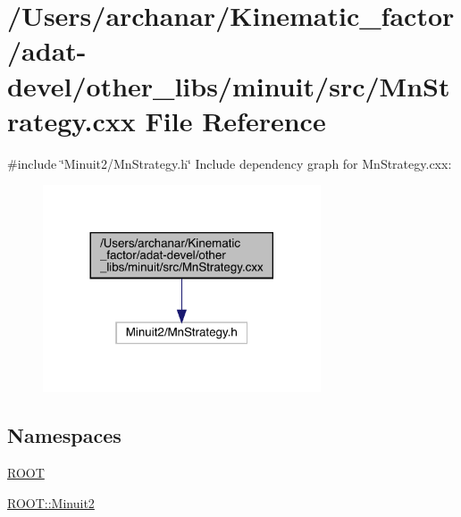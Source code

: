 \hypertarget{adat-devel_2other__libs_2minuit_2src_2MnStrategy_8cxx}{}\section{/\+Users/archanar/\+Kinematic\+\_\+factor/adat-\/devel/other\+\_\+libs/minuit/src/\+Mn\+Strategy.cxx File Reference}
\label{adat-devel_2other__libs_2minuit_2src_2MnStrategy_8cxx}
{\ttfamily \#include \char`\"{}Minuit2/\+Mn\+Strategy.\+h\char`\"{}}\newline
Include dependency graph for Mn\+Strategy.\+cxx\+:
\nopagebreak
\begin{figure}[H]
\begin{center}
\leavevmode
\includegraphics[width=233pt]{df/dfe/adat-devel_2other__libs_2minuit_2src_2MnStrategy_8cxx__incl}
\end{center}
\end{figure}
\subsection*{Namespaces}
\begin{DoxyCompactItemize}
\item 
 \mbox{\hyperlink{namespaceROOT}{R\+O\+OT}}
\item 
 \mbox{\hyperlink{namespaceROOT_1_1Minuit2}{R\+O\+O\+T\+::\+Minuit2}}
\end{DoxyCompactItemize}
